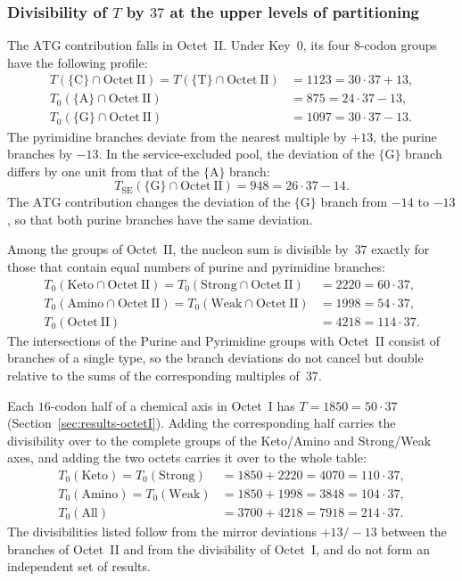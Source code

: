 \documentclass[11pt,a4paper]{article}
\renewcommand{\_}{\origunderscore\allowbreak}
\begin{document}
\subsubsection{Divisibility of \texorpdfstring{$T$}{T} by
\texorpdfstring{$37$}{37} at the upper levels of partitioning}

The $\mathrm{ATG}$ contribution falls in Octet~II. Under Key~0, its
four $8$-codon groups have the following profile:
\[
\begin{aligned}
T(\{\mathrm{C}\}\cap\mathrm{Octet~II})
  =T(\{\mathrm{T}\}\cap\mathrm{Octet~II})
  &=1123=30\cdot37+13, \\
T_{0}(\{\mathrm{A}\}\cap\mathrm{Octet~II})
  &=875=24\cdot37-13, \\
T_{0}(\{\mathrm{G}\}\cap\mathrm{Octet~II})
  &=1097=30\cdot37-13.
\end{aligned}
\]
The pyrimidine branches deviate from the nearest multiple by $+13$,
the purine branches by $-13$. In the service-excluded pool, the
deviation of the $\{\mathrm{G}\}$ branch differs by one unit from
that of the $\{\mathrm{A}\}$ branch:
\[
T_{\mathrm{SE}}(\{\mathrm{G}\}\cap\mathrm{Octet~II})
  =948=26\cdot37-14.
\]
The $\mathrm{ATG}$ contribution changes the deviation of the
$\{\mathrm{G}\}$ branch from $-14$ to $-13$, so that both purine
branches have the same deviation.

Among the groups of Octet~II, the nucleon sum is divisible by~$37$
exactly for those that contain equal numbers of purine and
pyrimidine branches:
\[
\begin{aligned}
T_{0}(\mathrm{Keto}\cap\mathrm{Octet~II})
  =T_{0}(\mathrm{Strong}\cap\mathrm{Octet~II})
  &=2220=60\cdot37, \\
T_{0}(\mathrm{Amino}\cap\mathrm{Octet~II})
  =T_{0}(\mathrm{Weak}\cap\mathrm{Octet~II})
  &=1998=54\cdot37, \\
T_{0}(\mathrm{Octet~II})
  &=4218=114\cdot37.
\end{aligned}
\]
The intersections of the Purine and Pyrimidine groups with Octet~II
consist of branches of a single type, so the branch deviations do not
cancel but double relative to the sums of the corresponding
multiples of~$37$.

Each $16$-codon half of a chemical axis in Octet~I has
$T=1850=50\cdot37$ (Section~\ref{sec:results-octetI}). Adding the
corresponding half carries the divisibility over to the complete
groups of the Keto/Amino and Strong/Weak axes, and adding the two
octets carries it over to the whole table:
\[
\begin{aligned}
T_{0}(\mathrm{Keto})=T_{0}(\mathrm{Strong})
  &=1850+2220=4070=110\cdot37, \\
T_{0}(\mathrm{Amino})=T_{0}(\mathrm{Weak})
  &=1850+1998=3848=104\cdot37, \\
T_{0}(\mathrm{All})
  &=3700+4218=7918=214\cdot37.
\end{aligned}
\]
The divisibilities listed follow from the mirror deviations
$+13/-13$ between the branches of Octet~II and from the
divisibility of Octet~I, and do not form an independent set of
results.
\end{document}
